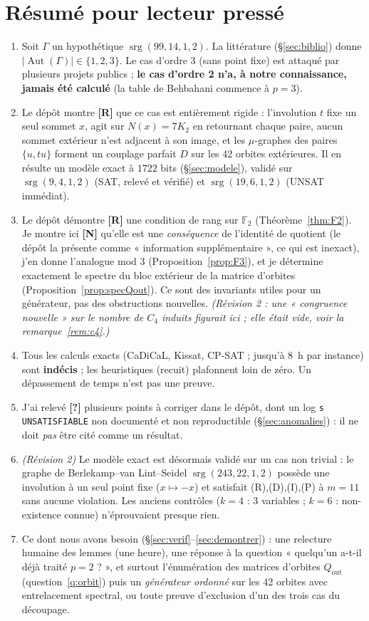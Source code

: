 \documentclass[11pt,a4paper]{article}
\theoremstyle{definition}
\theoremstyle{remark}
\newcommand{\F}{\mathbb{F}}
\newcommand{\srg}{\operatorname{srg}}
\newcommand{\Aut}{\operatorname{Aut}}
\newcommand{\Qout}{Q_{\mathrm{out}}}
\newcommand{\st}[1]{\textbf{[#1]}}
\newcommand{\code}[1]{\texttt{#1}}
\begin{document}
\section{Résumé pour lecteur pressé}
\begin{enumerate}[nosep]
\item Soit $\Gamma$ un hypothétique $\srg(99,14,1,2)$. La littérature (§\ref{sec:biblio}) donne $|\Aut(\Gamma)|\in\{1,2,3\}$. Le cas d'ordre 3 (sans point fixe) est
attaqué par plusieurs projets publics ; \textbf{le cas d'ordre 2 n'a, à notre connaissance, jamais été calculé} (la table de Behbahani commence à $p=3$).
\item Le dépôt montre \st{R} que ce cas est entièrement rigide : l'involution $t$ fixe un seul sommet $x$, agit sur $N(x)=7K_2$ en retournant chaque paire,
aucun sommet extérieur n'est adjacent à son image, et les $\mu$-graphes des paires $\{u,tu\}$ forment un couplage parfait $D$ sur les 42 orbites extérieures.
Il en résulte un modèle exact à $1722$ bits (§\ref{sec:modele}), validé sur $\srg(9,4,1,2)$ (SAT, relevé et vérifié) et $\srg(19,6,1,2)$ (UNSAT immédiat).
\item Le dépôt démontre \st{R} une condition de rang sur $\F_2$ (Théorème~\ref{thm:F2}). Je montre ici \st{N} qu'elle est une \emph{conséquence} de l'identité de quotient
(le dépôt la présente comme « information supplémentaire », ce qui est inexact), j'en donne l'analogue mod 3 (Proposition~\ref{prop:F3}),
et je détermine exactement le spectre du bloc extérieur de la matrice d'orbites (Proposition~\ref{prop:specQout}). Ce sont des invariants utiles pour un générateur,
pas des obstructions nouvelles. \emph{(Révision 2 : une « congruence nouvelle » sur le nombre de $C_4$ induits figurait ici ; elle était vide, voir la remarque~\ref{rem:c4}.)}
\item Tous les calculs exacts (CaDiCaL, Kissat, CP-SAT ; jusqu'à $8$~h par instance) sont \textbf{indécis} ; les heuristiques (recuit) plafonnent loin de zéro.
Un dépassement de temps n'est pas une preuve.
\item J'ai relevé \st{?} plusieurs points à corriger dans le dépôt, dont un log \code{s UNSATISFIABLE} non documenté et non reproductible (§\ref{sec:anomalies}) :
il ne doit \emph{pas} être cité comme un résultat.
\item \emph{(Révision 2)} Le modèle exact est désormais validé sur un cas non trivial : le graphe de Berlekamp--van Lint--Seidel $\srg(243,22,1,2)$ possède une involution
à un seul point fixe ($x\mapsto-x$) et satisfait (R),(D),(I),(P) à $m=11$ sans aucune violation. Les anciens contrôles ($k=4$ : 3 variables ; $k=6$ : non-existence connue)
n'éprouvaient presque rien.
\item Ce dont nous avons besoin (§\ref{sec:verif}--\ref{sec:demontrer}) : une relecture humaine des lemmes (une heure), une réponse à la question
« quelqu'un a-t-il déjà traité $p=2$ ? », et surtout l'énumération des matrices d'orbites $\Qout$ (question~\ref{q:orbit}) puis un \emph{générateur ordonné}
sur les 42 orbites avec entrelacement spectral, ou toute preuve d'exclusion d'un des trois cas du découpage.
\end{enumerate}
\end{document}
